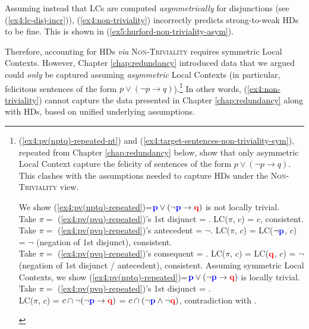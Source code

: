 Assuming instead that LCs are computed \textit{asymmetrically} for disjunctions (see (\ref{ex4:lc-disj-incr})), (\ref{ex4:non-triviality}) incorrectly predicts strong-to-weak HDs to be fine. This is shown in (\ref{ex5:hurford-non-triviality-asym}).

\begin{exe}
	\label{ex5:hurford-non-triviality-asym}
\end{exe}

Therefore, accounting for HDs \textit{via} \textsc{Non-Triviality} requires symmetric Local Contexts. However, Chapter \ref{chap:redundancy} introduced data that we argued could \textit{only} be captured assuming \textit{asymmetric} Local Contexts (in particular, felicitous sentences of the form $p \vee (\neg p \rightarrow q)$).\footnote{(\ref{ex4:pv(nptq)-repeated-nt}) and (\ref{ex4:target-sentences-non-triviality-sym}), repeated from Chapter \ref{chap:redundancy} below, show that only asymmetric Local Context capture the felicity of sentences of the form $p \vee (\neg p \rightarrow q)$. This clashes with the assumptions needed to capture HDs under the \textsc{Non-Triviality} view.
\begin{exe}
	 {\noindent We show  (\ref{ex4:pv(nptq)-repeated})=$\textbf{\textcolor{blue}{p}} \vee (\neg \textbf{\textcolor{blue}{p}} \rightarrow \textbf{\textcolor{red}{q}})$ is not locally trivial.\\
		Take $\pi =$ (\ref{ex4:pv(pvq)-repeated})'s 1st disjunct  = \p. LC($\pi$, $c$) = $c$, consistent.\\
		Take $\pi =$ (\ref{ex4:pv(pvq)-repeated})'s antecedent  = $\neg$\p. LC($\pi$, $c$) = LC($\neg \textbf{\textcolor{blue}{p}}$, $c$) = $\neg$\p{} (negation of 1st disjunct), consistent. \\
		Take $\pi =$ (\ref{ex4:pv(pvq)-repeated})'s consequent  = \q. LC($\pi$, $c$) = LC($\textbf{\textcolor{red}{q}}$, $c$) = $\neg$\p{} (negation of 1st disjunct / antecedent), consistent. 
	}
	 {Assuming symmetric Local Contexts, we show (\ref{ex4:pv(nptq)-repeated})=$\textbf{\textcolor{blue}{p}} \vee (\neg \textbf{\textcolor{blue}{p}} \rightarrow \textbf{\textcolor{red}{q}})$ is locally trivial.\\
		Take $\pi =$ (\ref{ex4:pv(pvq)-repeated})'s 1st disjunct  = \p.\\
		LC($\pi$, $c$) = $c\cap\neg(\neg\textbf{\textcolor{blue}{p}}\rightarrow\textbf{\textcolor{red}{q}})$ = $c\cap(\neg\textbf{\textcolor{blue}{p}}\wedge\neg\textbf{\textcolor{red}{q}})$, contradiction with \p.
	}
\end{exe}
} In other words, (\ref{ex4:non-triviality}) cannot capture the data presented in Chapter \ref{chap:redundancy} along with HDs, based on unified underlying assumptions.\\

